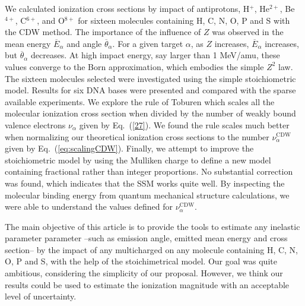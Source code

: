 \documentclass[preprint,12pt]{article}
\begin{document}
We calculated ionization cross sections by impact of antiprotons, 
H$^{+}$, He$^{2+}$, Be$^{4+}$, C$^{6+}$, and O$^{8+}$ for sixteen 
molecules containing H, C, N, O, P and S with the CDW method. The 
importance of the influence of $Z$ was observed in the mean energy 
$\overline{E}_{\alpha}$ and angle $\overline{\theta}_{\alpha}$. 
For a given target $\alpha$, as $Z$ increases, $\overline{E}_{\alpha}$ 
increases, but $\overline{\theta}_{\alpha}$ decreases. At high impact 
energy, say larger than 1 MeV/amu, these values converge to the Born 
approximation, which embodies the simple $Z^{2}$ law. The sixteen 
molecules selected were investigated using the simple stoichiometric 
model. Results for six DNA bases were presented and compared with the 
sparse available experiments. We explore the rule of Toburen which scales 
all the molecular ionization cross section when divided by the number of 
weakly bound valence electrons $\nu_{\alpha}$ given by Eq.~(\ref{27}). 
We found the rule scales much better when normalizing our theoretical 
ionization cross sections to the number $\nu_{\alpha}^{\text{CDW}}$ 
given by Eq.~(\ref{eq:scalingCDW}). Finally, we attempt to improve the 
stoichiometric model by using the Mulliken charge to define a new model 
containing fractional rather than integer proportions. No substantial 
correction was found, which indicates that the SSM works quite well.
By inspecting the molecular binding energy from quantum mechanical 
structure calculations, we were able to understand the values defined
for $\nu_{\alpha}^{\text{CDW}}$.

The main objective of this article is to provide the tools to estimate 
any inelastic parameter parameter --such as emission angle, emitted mean 
energy and cross section-- by the impact of any multicharged on any 
molecule containing H, C, N, O, P and S, with the help of the 
stoichimetrical model. Our goal was quite ambitious, considering the 
simplicity of our proposal. However, we think our results could be used 
to estimate the ionization magnitude with an acceptable level of 
uncertainty.

\bigskip
\end{document}
